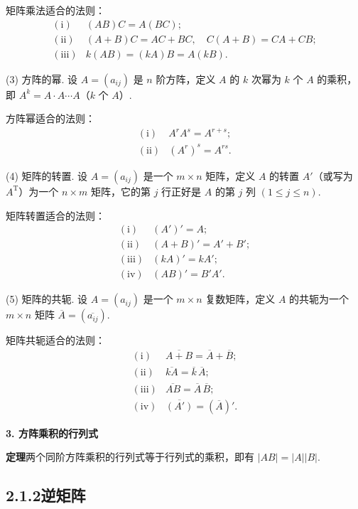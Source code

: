 \documentclass[UTF8,12pt,a4paper,fontset=fandol]{ctexart}
\begin{document}
矩阵乘法适合的法则：
\[
\begin{array}{ll}
\mathrm{(i)} & (AB)C=A(BC);\\
\mathrm{(ii)} & (A+B)C=AC+BC,\quad C(A+B)=CA+CB;\\
\mathrm{(iii)} & k(AB)=(kA)B=A(kB).
\end{array}
\]

(3) 方阵的幂. 设 $A=(a_{ij})$ 是 $n$ 阶方阵，定义 $A$ 的 $k$ 次幂为 $k$ 个 $A$ 的乘积，即 $A^k=A\cdot A\cdots A$（$k$ 个 $A$）.

方阵幂适合的法则：
\[
\begin{array}{ll}
\mathrm{(i)} & A^rA^s=A^{r+s};\\
\mathrm{(ii)} & (A^r)^s=A^{rs}.
\end{array}
\]

(4) 矩阵的转置. 设 $A=(a_{ij})$ 是一个 $m\times n$ 矩阵，定义 $A$ 的转置 $A'$（或写为 $A^{\mathrm T}$）为一个 $n\times m$ 矩阵，它的第 $j$ 行正好是 $A$ 的第 $j$ 列 $(1\le j\le n)$.

矩阵转置适合的法则：
\[
\begin{array}{ll}
\mathrm{(i)} & (A')'=A;\\
\mathrm{(ii)} & (A+B)'=A'+B';\\
\mathrm{(iii)} & (kA)'=kA';\\
\mathrm{(iv)} & (AB)'=B'A'.
\end{array}
\]

(5) 矩阵的共轭. 设 $A=(a_{ij})$ 是一个 $m\times n$ 复数矩阵，定义 $A$ 的共轭为一个 $m\times n$ 矩阵 $\overline A=(\overline{a_{ij}})$.

矩阵共轭适合的法则：
\[
\begin{array}{ll}
\mathrm{(i)} & \overline{A+B}=\overline A+\overline B;\\
\mathrm{(ii)} & \overline{kA}=\overline k\,\overline A;\\
\mathrm{(iii)} & \overline{AB}=\overline A\,\overline B;\\
\mathrm{(iv)} & \overline{(A')}=(\overline A)'.
\end{array}
\]

\noindent\textbf{3. 方阵乘积的行列式}

\noindent\textbf{定理}\quad 两个同阶方阵乘积的行列式等于行列式的乘积，即有 $|AB|=|A||B|$.

\subsection*{2.1.2\quad 逆矩阵}
\end{document}
